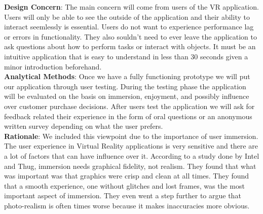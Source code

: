 \documentclass[10pt,journal,compsoc,onecolumn, draftclsnofoot]{IEEEtran}
\begin{document}
\hangindent=0.5cm \textbf{Design Concern}: The main concern will come from
users of the VR application. Users will only be able to see the outside of the
application and their ability to interact seemlessly is essential. Users do not
want to experience performance lag or errors in functionality. They also
souldn't need to ever leave the application to ask questions about how to
perform tasks or interact with objects. It must be an intuitive application
that is easy to understand in less than 30 seconds given a minor introduction
beforehand. \\

\hangindent=0.5cm \textbf{Analytical Methods}: Once we have a fully functioning
prototype we will put our application through user testing. During the testing
phase the application will be evaluated on the basis on immersion, enjoyment,
and possibly influence over customer purchase decisions. After users test the
application we will ask for feedback related their experience in the form of
oral questions or an anonymous written survey depending on what the user
prefers. \\

\hangindent=0.5cm \textbf{Rationale}: We included this viewpoint due to the importance of user immersion. The user experience in Virtual Reality applications is very sensitive and there are a lot of factors that can have influence over it. According to a study done by Intel and Thug\cite{michalak_lind_round1}, immersion needs graphical fidelity, not realism. They found that what was important was that graphics were crisp and clean at all times. They found that a smooth experience, one without glitches and lost frames, was the most important aspect of immersion. They even went a step further to argue that photo-realism is often times worse because it makes inaccuracies more obvious. \\
\end{document}
